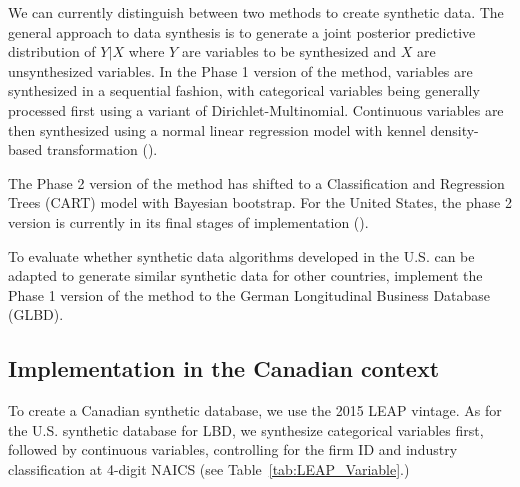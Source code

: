 \documentclass{article}
\begin{document}
We can currently distinguish between two methods to create synthetic data. The general approach to data synthesis is to generate a joint posterior predictive distribution of $Y|X$ where $Y$ are variables to be synthesized and $X$ are unsynthesized variables. In the Phase 1 version of the method, variables are synthesized in a sequential fashion, with categorical variables being generally processed first using a variant of Dirichlet-Multinomial. Continuous variables are then synthesized using a normal linear regression model with kennel density-based transformation (\textcite{WOODCOCK20094228}). 

The Phase 2 version of the method has shifted to a Classification and Regression Trees (CART) model with Bayesian bootstrap. For the United States, the phase 2 version  is currently in its final stages of implementation (\textcite{RePEc:cen:wpaper:14-12}). 

To evaluate whether synthetic data algorithms developed in the U.S. can be adapted to generate similar synthetic data for other countries, \textcite{RePEc:cen:wpaper:14-13} implement the Phase 1 version of the method to the German Longitudinal Business Database (GLBD). 

\subsection{Implementation in the Canadian context}

To create a Canadian synthetic database, we use the 2015 LEAP vintage. As for the U.S. synthetic database for LBD, we synthesize categorical variables first, followed by continuous variables, controlling for the firm ID and industry classification at 4-digit NAICS (see Table~\ref{tab:LEAP_Variable}.)


\end{document}
